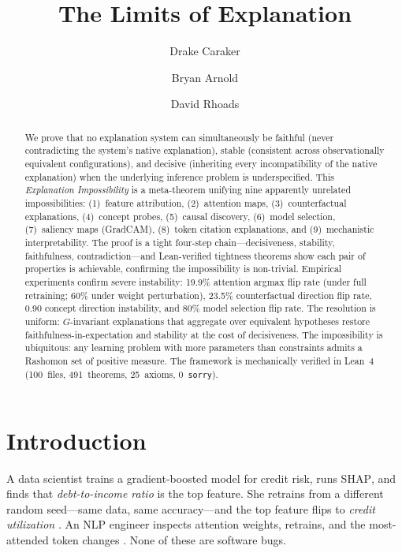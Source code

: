 \documentclass{article}
\title{The Limits of Explanation}
\author{Drake Caraker \and Bryan Arnold \and David Rhoads}
\newcommand{\SHAP}{\textsc{SHAP}}
\begin{document}
\maketitle

\begin{abstract}
We prove that no explanation system can simultaneously be
faithful (never contradicting the system's native explanation), stable
(consistent across observationally equivalent configurations), and decisive
(inheriting every incompatibility of the native explanation) when
the underlying inference problem is underspecified.
This \emph{Explanation Impossibility} is a meta-theorem unifying nine apparently unrelated
impossibilities: (1)~feature attribution, (2)~attention maps, (3)~counterfactual explanations,
(4)~concept probes, (5)~causal discovery, (6)~model selection, (7)~saliency maps (GradCAM),
(8)~token citation explanations, and (9)~mechanistic interpretability.
The proof is a tight four-step chain---decisiveness, stability, faithfulness,
contradiction---and Lean-verified tightness theorems show each pair of
properties is achievable, confirming the impossibility is non-trivial.
Empirical experiments confirm severe instability: 19.9\% attention argmax flip rate
(under full retraining; 60\% under weight perturbation), 23.5\%
counterfactual direction flip rate, 0.90 concept direction instability,
and 80\% model selection flip rate.
The resolution is uniform: $G$-invariant explanations that aggregate
over equivalent hypotheses restore faithfulness-in-expectation and stability at the cost of
decisiveness.
The impossibility is ubiquitous: any learning problem with more
parameters than constraints admits a Rashomon set of positive measure.
The framework is mechanically verified in Lean~4 (100~files, 491~theorems, 25~axioms, 0~\texttt{sorry}).
\end{abstract}

\section{Introduction}
\label{sec:intro}

A data scientist trains a gradient-boosted model for credit risk, runs \SHAP{},
and finds that \emph{debt-to-income ratio} is the top feature.  She retrains
from a different random seed---same data, same accuracy---and the top feature flips to \emph{credit utilization}
\citep{krishna2022disagreement}.  An NLP engineer inspects attention weights,
retrains, and the most-attended token changes \citep{jainwallace2019}.  None of these are software bugs.
\end{document}
